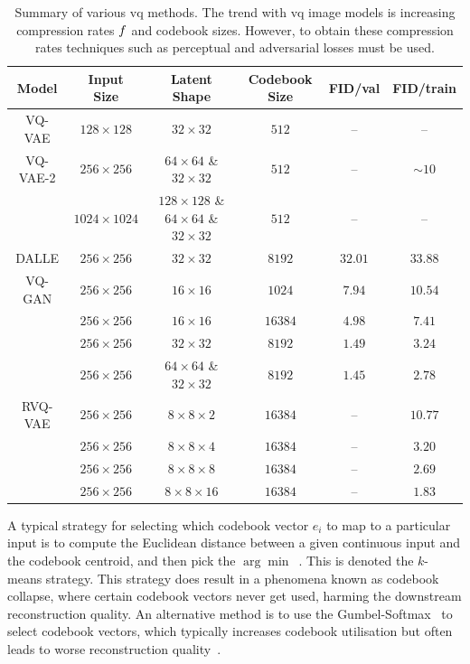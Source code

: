 \begin{table}[ht]
    \centering
    \begin{tabular}{|c|c|c|c|c|c|}
        \hline
        \textbf{Model} & \textbf{Input Size} & \textbf{Latent Shape} & \textbf{Codebook Size} & \textbf{FID/val} & \textbf{FID/train} \\
        \hline
        VQ-VAE & $128 \times 128$ & $32 \times 32$ & $512$ & -- & -- \\
        \hline
        VQ-VAE-2 & $256 \times 256$ & $64 \times 64$ \& $32 \times 32$ & $512$ & --& $\sim 10$ \\
                 & $1024 \times 1024$ & $128 \times 128$ \& $64 \times 64$ \& $32 \times 32$ & $512$ & -- & -- \\
        \hline
        DALLE & $256 \times 256$ & $32 \times 32$ & $8192$ & $32.01$ & $33.88$ \\
        \hline
        VQ-GAN & $256 \times 256$ & $16 \times 16$ & $1024$ & $7.94$ & $10.54$ \\
        & $256 \times 256$ & $16 \times 16$ & $16384$ & $4.98$ & $7.41$ \\
        & $256 \times 256$ & $32 \times 32$ & $8192$ & $1.49$ & $3.24$ \\
        & $256 \times 256$ & $64 \times 64$ \& $32 \times 32$ & $8192$ & $1.45$ & $2.78$ \\
        \hline
        RVQ-VAE & $256 \times 256$ & $8 \times 8 \times 2$ & $16384$ & -- & $10.77$ \\
        & $256 \times 256$ & $8 \times 8 \times 4$ & $16384$ & -- & $3.20$ \\
        & $256 \times 256$ & $8 \times 8 \times 8$ & $16384$ & -- & $2.69$ \\
        & $256 \times 256$ & $8 \times 8 \times 16$ & $16384$ & -- & $1.83$ \\
        \hline
    \end{tabular}
    \caption[Table]{Summary of various \acrfull{vq} methods. The trend with
    \gls{vq} image models is increasing compression rates $f$ and
    codebook sizes. However, to obtain these compression rates techniques such
    as perceptual and adversarial losses must be used.}
\end{table}

A typical strategy for selecting which codebook vector $e_i$ to map to a
particular input is to compute the Euclidean distance between a given continuous
input and the codebook centroid, and then pick the
$\arg\min$~\cite{oord2017vqvae}. This is denoted the $k$-means strategy. This
strategy does result in a phenomena known as codebook collapse, where certain
codebook vectors never get used, harming the downstream reconstruction quality.
An alternative method is to use the Gumbel-Softmax~\cite{jang2016gumbel} to
select codebook vectors, which typically increases codebook utilisation but
often leads to worse reconstruction quality~\cite{bondtaylor2021unleashing}.

